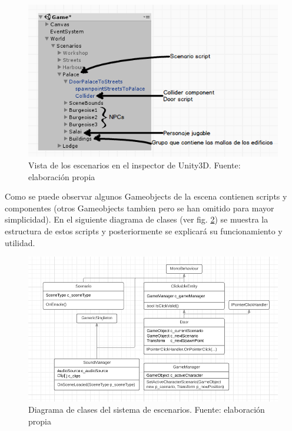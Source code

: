 \begin{figure}
\begin{center}
\includegraphics[scale=1]{imagenes/unityScenarios.png}
\caption{Vista de los escenarios en el inspector de Unity3D.  Fuente: elaboración propia}
\label{unityScenarios}
\end{center}
\end{figure}

Como se puede observar algunos Gameobjects de la escena contienen scripts y componentes (otros Gameobjects tambien pero se han omitido para mayor simplicidad). En el siguiente diagrama de clases (ver fig. \ref{sceneClassDiagram}) se muestra la estructura de estos scripts y posteriormente se explicará su funcionamiento y utilidad.

\begin{figure}
\begin{center}
\includegraphics[scale=0.75]{imagenes/sceneClassDiagram.PNG}
\caption{Diagrama de clases del sistema de escenarios.  Fuente: elaboración propia}
\label{sceneClassDiagram}
\end{center}
\end{figure}


